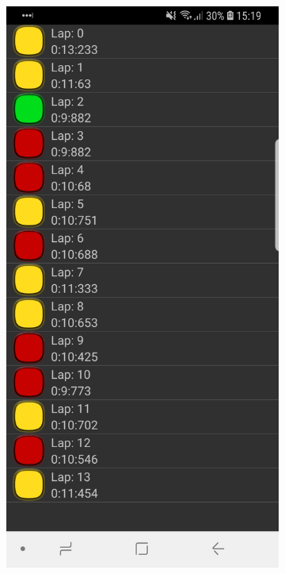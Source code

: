 \begin{figure}[H]
	\begin{subfigure}[c]{0.32\textwidth}
		\includegraphics[width=\textwidth]{Pictures/App/LapList.jpg}
		

\end{subfigure}
\end{figure}
